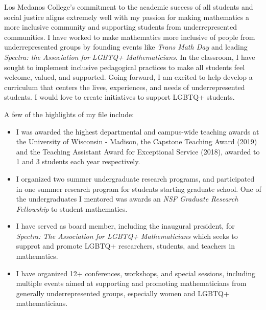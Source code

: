 \documentclass[11pt]{article}
\begin{document}
Los Medanos College’s commitment to the academic success of all students and social justice aligns extremely well with my passion for making mathematics a more inclusive community and supporting students from underrepresented communities. I have worked to make mathematics more inclusive of people from underrepresented groups by founding events like \textit{Trans Math Day} and leading \textit{Spectra: the Association for LGBTQ+ Mathematicians}.  In the classroom, I have sought to implement inclusive pedagogical practices to make all students feel welcome, valued, and supported. Going forward, I am excited to help develop a curriculum that centers the lives, experiences, and needs of underrepresented students. I would love to create initiatives to support LGBTQ+ students. 

A few of the highlights of my file include:

\begin{itemize}[leftmargin=*]
\item I was awarded the highest departmental and campus-wide teaching awards at the University of Wisconsin - Madison, the Capstone Teaching Award (2019) and the Teaching Assistant Award for Exceptional Service (2018), awarded to 1 and 3 students each year respectively. 
\item I organized two summer undergraduate research programs, and participated in one summer research program for students starting graduate school. One of the undergraduates I mentored was awards an \textit{NSF Graduate Research Fellowship} to student mathematics.  
\item I have served as board member, including the inaugural president, for \textit{Spectra: The Association for LGBTQ+ Mathematicians} which seeks to supprot and promote LGBTQ+ researchers, students, and teachers in mathematics. 
\item I have organized 12+ conferences, workshops, and special sessions, including multiple events aimed at supporting and promoting mathematicians from generally underrepresented groups, especially women and LGBTQ+ mathematicians. 
\end{itemize}
\end{document}
